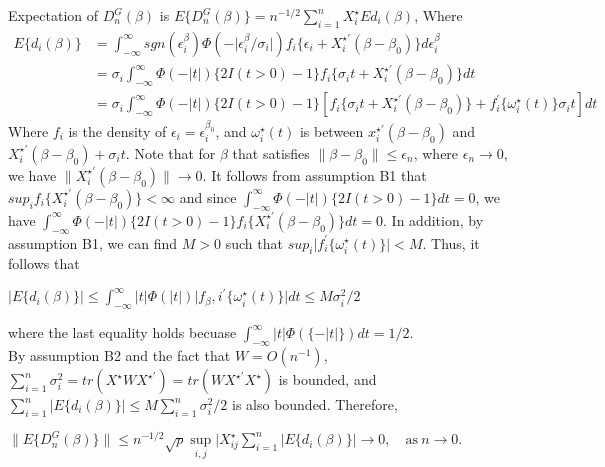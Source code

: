 \documentclass[12pt]{article}
\begin{document}
	\noindent Expectation of $D_n^G(\beta)$ is
	$E\{D_n^G(\beta)\}=n^{-1/2}\sum_{i=1}^{n}X_i^\star E{d_i(\beta)}$,
	\noindent Where 
	\begin{align*}
	E\{d_i(\beta)\} & = \int_{-\infty}^{\infty}sgn(\epsilon_i^\beta)\Phi(-\lvert\epsilon_i^\beta/\sigma_i\rvert)f_i\{\epsilon_i+X_i^{\star \prime}(\beta-\beta_0)\}d\epsilon_i^\beta\\
	& = \sigma_i \int_{-\infty}^{\infty}\Phi(-\lvert t \rvert)\{2I(t>0)-1\}f_i\{\sigma_i t + X_i^{\star \prime}(\beta-\beta_0)\}dt\\
	& = \sigma_i \int_{-\infty}^{\infty}\Phi(-\lvert t \rvert)\{2I(t>0)-1\}[f_i\{\sigma_i t + X_i^{\star \prime}(\beta-\beta_0)\}+f_i^\prime\{\omega_i^\star(t)\}\sigma_i t]dt
	\end{align*}
	\noindent Where $f_i$ is the density of $\epsilon_i=\epsilon_i^{\beta_0}$, and $\omega_i^\star(t)$ is between $x_i^{\star \prime} (\beta-\beta_0)$ and $X_i^{\star \prime} (\beta-\beta_0)+\sigma_i t$. Note that for $\beta$ that satisfies $\lVert \beta-\beta_0 \rVert \leq \epsilon_n$, where $\epsilon_n \to 0$, we have $\lVert X_i^{\star \prime} (\beta-\beta_0) \rVert \to 0$. It follows from assumption B1 that $sup_i f_i \{X_i^{\star \prime} (\beta-\beta_0)\}<\infty$ and since $\int_{-\infty}^{\infty} \Phi(-\lvert t \rvert)\{2I(t>0)-1\}dt=0$, we have $\int_{-\infty}^{\infty} \Phi(-\lvert t \rvert)\{2I(t>0)-1\}f_i \{X_i^{\star \prime} (\beta-\beta_0)\}dt=0$. In addition, by assumption B1, we can find $M>0$ such that $sup_i \lvert f_i^\prime \{\omega_i^\star (t)\}\rvert<M$. Thus, it follows that\\
	
	\begin{center}
	$\lvert E\{d_i(\beta)\} \rvert \leq \int_{-\infty}^{\infty} \lvert t \rvert \Phi(\lvert t \rvert) \lvert f_\beta, i ^\prime \{\omega_i^\star(t)\}\rvert dt \leq M \sigma_i^2 /2$
	\end{center}
	
	\noindent where the last equality holds becuase $\int_{-\infty}^{\infty} \lvert t \rvert \Phi (\{-\lvert t \rvert\})dt=1/2$.\\
	
	\noindent By assumption B2 and the fact that $W=O(n^{-1})$, $\sum_{i=1}^{n} \sigma_i^2=tr(X^\star W X^{\star \prime})=tr(W X^{\star \prime}X^\star)$ is bounded, and $\sum_{i=1}^{n} \lvert E\{d_i(\beta)\} \rvert \leq M \sum_{i=1}^{n}\sigma_i^2 /2$ is also bounded. Therefore,
	
	\begin{center}
	$\lVert E\{D_n^G(\beta)\} \rVert \leq n^{-1/2} \sqrt{p} \sup\limits_{i,j} \lvert X_{ij}^{\star} \sum_{i=1}^{n} \lvert E\{d_i(\beta)\} \rvert \to 0,\quad \text{as}\ n\to 0.$
	\end{center}
	
\end{document}

